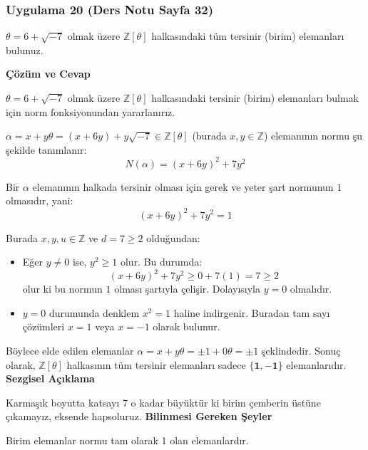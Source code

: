 \documentclass[11pt, a4paper]{article}
\newenvironment{cozum}{
    \vspace{0.5cm}
    \noindent\textcolor{green!60!black}{\faCheckCircle\enspace \textbf{\Large Çözüm ve Cevap}}\par\vspace{0.2cm}
}{}
\newenvironment{sezgisel}{
    \vspace{0.5cm}
    \noindent\textcolor{orange!80!black}{\faLightbulb\enspace \textbf{\Large Sezgisel Açıklama}}\par\vspace{0.2cm}
    \itshape
}{}
\newenvironment{bilgi}{
    \vspace{0.5cm}
    \noindent\textcolor{red!70!black}{\faExclamationTriangle\enspace \textbf{\Large Bilinmesi Gereken Şeyler}}\par\vspace{0.2cm}
}{}
\begin{document}
\subsubsection{Uygulama 20 (Ders Notu Sayfa 32)}
\begin{sorubox}
$\theta = 6 + \sqrt{-7}$ olmak üzere $\mathbb{Z}[\theta]$ halkasındaki tüm tersinir (birim) elemanları bulunuz.
\end{sorubox}
\begin{cozum}
$\theta = 6 + \sqrt{-7}$ olmak üzere $\mathbb{Z}[\theta]$ halkasındaki tersinir (birim) elemanları bulmak için norm fonksiyonundan yararlanırız.

$\alpha = x + y\theta = (x + 6y) + y\sqrt{-7} \in \mathbb{Z}[\theta]$ (burada $x, y \in \mathbb{Z}$) elemanının normu şu şekilde tanımlanır:
\[ N(\alpha) = (x + 6y)^2 + 7 y^2 \]

Bir $\alpha$ elemanının halkada tersinir olması için gerek ve yeter şart normunun $1$ olmasıdır, yani:
\[ (x + 6y)^2 + 7 y^2 = 1 \]

Burada $x, y, u \in \mathbb{Z}$ ve $d = 7 \ge 2$ olduğundan:
\begin{itemize}
    \item Eğer $y \neq 0$ ise, $y^2 \ge 1$ olur. Bu durumda:
    \[ (x + 6y)^2 + 7 y^2 \ge 0 + 7(1) = 7 \ge 2 \]
    olur ki bu normun $1$ olması şartıyla çelişir. Dolayısıyla $y = 0$ olmalıdır.
    \item $y = 0$ durumunda denklem $x^2 = 1$ haline indirgenir. Buradan tam sayı çözümleri $x = 1$ veya $x = -1$ olarak bulunur.
\end{itemize}

Böylece elde edilen elemanlar $\alpha = x + y\theta = \pm 1 + 0\theta = \pm 1$ şeklindedir. Sonuç olarak, $\mathbb{Z}[\theta]$ halkasının tüm tersinir elemanları sadece $\mathbf{\{1, -1\}}$ elemanlarıdır.
\end{cozum}
\begin{sezgisel}
Karmaşık boyutta katsayı 7 o kadar büyüktür ki birim çemberin üstüne çıkamayız, eksende hapsoluruz.
\end{sezgisel}
\begin{bilgi}
Birim elemanlar normu tam olarak 1 olan elemanlardır.
\end{bilgi}

\newpage
\end{document}
